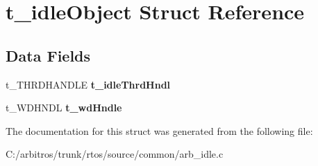 \hypertarget{structt__idle_object}{\section{t\-\_\-idle\-Object Struct Reference}
\label{structt__idle_object}
}
\subsection*{Data Fields}
\begin{DoxyCompactItemize}
\item 
\hypertarget{structt__idle_object_a59ffa68661389e81dd082d0193f59a3f}{t\-\_\-\-T\-H\-R\-D\-H\-A\-N\-D\-L\-E {\bfseries t\-\_\-idle\-Thrd\-Hndl}}\label{structt__idle_object_a59ffa68661389e81dd082d0193f59a3f}

\item 
\hypertarget{structt__idle_object_a7ca55a91c84241ecfe4a0dc5ea1c1621}{t\-\_\-\-W\-D\-H\-N\-D\-L {\bfseries t\-\_\-wd\-Hndle}}\label{structt__idle_object_a7ca55a91c84241ecfe4a0dc5ea1c1621}

\end{DoxyCompactItemize}


The documentation for this struct was generated from the following file\-:\begin{DoxyCompactItemize}
\item 
C\-:/arbitros/trunk/rtos/source/common/arb\-\_\-idle.\-c\end{DoxyCompactItemize}
